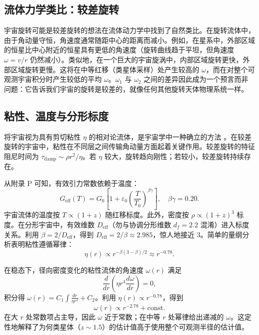 \documentclass[11pt,a4paper]{article}
\begin{document}
	\subsection{流体力学类比：较差旋转}
	
	宇宙旋转可能是较差旋转的想法在流体动力学中找到了自然类比。在旋转流体中，由于角动量守恒，角速度通常随距中心的距离而减小。例如，在星系中，外部区域的恒星比中心附近的恒星具有更低的角速度（旋转曲线趋于平坦，但角速度 \(\omega = v/r\) 仍然减小）。类似地，在一个巨大的宇宙旋涡中，内部区域旋转更快，外部区域旋转更慢。这将在中等红移（类星体采样）处产生较高的 \(\omega\)，而在对整个可观测宇宙积分时产生较低的平均 \(\omega\)。\(\omega_1\) 与 \(\omega_2\) 之间的差异因此成为一个预言而非问题：它告诉我们宇宙的旋转是较差的，就像任何其他旋转天体物理系统一样。
	
	\subsection{粘性、温度与分形标度}
	
	将宇宙视为具有剪切粘性 \(\eta\) 的相对论流体，是宇宙学中一种确立的方法 \cite{Giovannini2005}。在较差旋转的宇宙中，粘性在不同层之间传输角动量方面起着关键作用。较差旋转的特征阻尼时间为 \(\tau_{\mathrm{damp}} \sim \rho r^2 / \eta\)。若 \(\eta\) 较大，旋转趋向刚性；若较小，较差旋转持续存在。
	
	从附录 P 可知，有效引力常数依赖于温度：
	\begin{equation}
		G_{\mathrm{eff}}(T) = G_0\left[1 + \varepsilon_0\left(\frac{T}{T_0}\right)^{\beta\gamma}\right], \quad \beta\gamma = 0.20.
	\end{equation}
	宇宙流体的温度按 \(T \propto (1+z)\) 随红移标度。此外，密度按 \(\rho \propto (1+z)^3\) 标度。在分形宇宙中，有效维数 \(D_{\mathrm{eff}}\)（勿与协调分形维数 \(d_f = 2.2\) 混淆）进入标度关系。利用 \(\beta = 2/D_{\mathrm{eff}}\)，得到 \(D_{\mathrm{eff}} = 2/\beta \approx 2.985\)，惊人地接近 3。简单的量纲分析表明粘性遵循幂律：
	\begin{equation}
		\eta(r) \propto r^{-\beta(3-\beta)/2} \approx r^{-0.78}.
	\end{equation}
	
	在稳态下，径向密度变化的粘性流体的角速度 \(\omega(r)\) 满足
	\begin{equation}
		\frac{d}{dr}\left( \eta r^4 \frac{d\omega}{dr} \right) = 0,
	\end{equation}
	积分得 \(\omega(r) = C_1 \int \frac{dr}{\eta r^4} + C_2\)。利用 \(\eta(r) \propto r^{-0.78}\)，得到
	\begin{equation}
		\omega(r) \propto r^{-2.78} + \text{const}.
	\end{equation}
	在大 \(r\) 处常数项占主导，因此 \(\omega\) 近于常数；在中等 \(r\) 处幂律给出递减的 \(\omega\)。这定性地解释了为何类星体（\(z\sim1.5\)）的估计值高于使用整个可观测半径的估计值。
	
\end{document}
